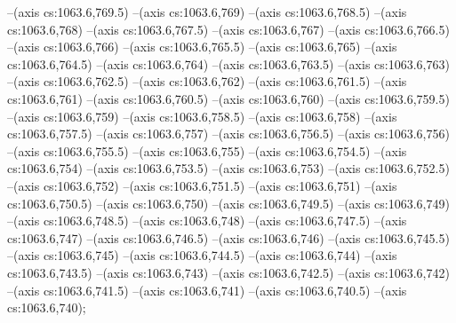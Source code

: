 --(axis cs:1063.6,769.5)
--(axis cs:1063.6,769)
--(axis cs:1063.6,768.5)
--(axis cs:1063.6,768)
--(axis cs:1063.6,767.5)
--(axis cs:1063.6,767)
--(axis cs:1063.6,766.5)
--(axis cs:1063.6,766)
--(axis cs:1063.6,765.5)
--(axis cs:1063.6,765)
--(axis cs:1063.6,764.5)
--(axis cs:1063.6,764)
--(axis cs:1063.6,763.5)
--(axis cs:1063.6,763)
--(axis cs:1063.6,762.5)
--(axis cs:1063.6,762)
--(axis cs:1063.6,761.5)
--(axis cs:1063.6,761)
--(axis cs:1063.6,760.5)
--(axis cs:1063.6,760)
--(axis cs:1063.6,759.5)
--(axis cs:1063.6,759)
--(axis cs:1063.6,758.5)
--(axis cs:1063.6,758)
--(axis cs:1063.6,757.5)
--(axis cs:1063.6,757)
--(axis cs:1063.6,756.5)
--(axis cs:1063.6,756)
--(axis cs:1063.6,755.5)
--(axis cs:1063.6,755)
--(axis cs:1063.6,754.5)
--(axis cs:1063.6,754)
--(axis cs:1063.6,753.5)
--(axis cs:1063.6,753)
--(axis cs:1063.6,752.5)
--(axis cs:1063.6,752)
--(axis cs:1063.6,751.5)
--(axis cs:1063.6,751)
--(axis cs:1063.6,750.5)
--(axis cs:1063.6,750)
--(axis cs:1063.6,749.5)
--(axis cs:1063.6,749)
--(axis cs:1063.6,748.5)
--(axis cs:1063.6,748)
--(axis cs:1063.6,747.5)
--(axis cs:1063.6,747)
--(axis cs:1063.6,746.5)
--(axis cs:1063.6,746)
--(axis cs:1063.6,745.5)
--(axis cs:1063.6,745)
--(axis cs:1063.6,744.5)
--(axis cs:1063.6,744)
--(axis cs:1063.6,743.5)
--(axis cs:1063.6,743)
--(axis cs:1063.6,742.5)
--(axis cs:1063.6,742)
--(axis cs:1063.6,741.5)
--(axis cs:1063.6,741)
--(axis cs:1063.6,740.5)
--(axis cs:1063.6,740);
